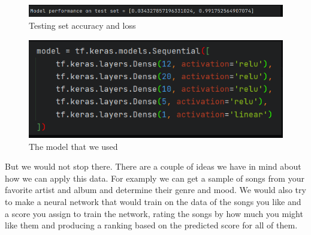 \documentclass[12pt, oneside, a4paper]{article}
\begin{document}
    \FloatBarrier 
    \begin{figure}[H]
        \caption{Testing set accuracy and loss} 
        \centerline{
        \includegraphics[width=\textwidth]{test_set.PNG}
        } 
    \end{figure}
    
    \FloatBarrier 
    \begin{figure}[H]
        \caption{The model that we used} 
        \centerline{
        \includegraphics[width=\textwidth]{model.PNG}
        } 
    \end{figure}

    But we would not stop there. There are a couple of ideas we have in mind about how we can apply this data. For examply we can get a sample of songs from your favorite artist and album and determine their genre and mood. We would also try to make a neural network that would train on the data of the songs you like and a score you assign to train the network, rating the songs by how much you might like them and producing a ranking based on the predicted score for all of them. 
\end{document}

